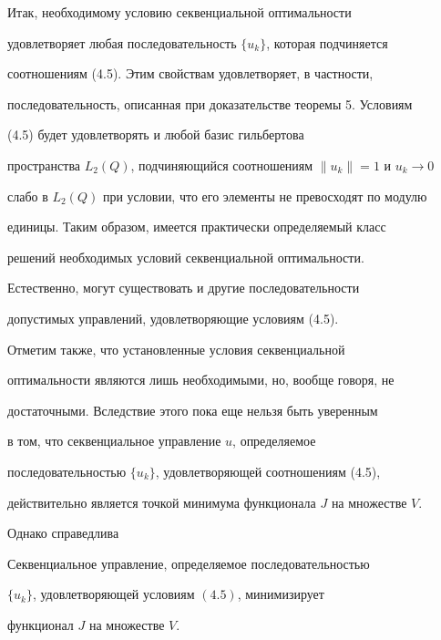  


Итак, необходимому условию секвенциальной оптимальности 


удовлетворяет любая последовательность $\{u_k\}$, которая подчиняется 


соотношениям (4.5). Этим свойствам удовлетворяет, в частности, 


последовательность, описанная при доказательстве теоремы 5. Условиям 


(4.5) будет удовлетворять и любой базис гильбертова 


пространства $L_2(Q)$, подчиняющийся соотношениям $\|u_k\|=1$ и $u_k\to0$ 


слабо в $L_2(Q)$ при условии, что его элементы не превосходят по модулю 


единицы. Таким образом, имеется практически определяемый класс 


решений необходимых условий секвенциальной оптимальности. 


Естественно, могут существовать и другие последовательности 


допустимых управлений, удовлетворяющие условиям (4.5). 


 


Отметим также, что установленные условия секвенциальной 


оптимальности являются лишь необходимыми, но, вообще говоря, не 


достаточными. Вследствие этого пока еще нельзя быть уверенным 


в том, что секвенциальное управление $u$, определяемое 


последовательностью $\{u_k\}$, удовлетворяющей соотношениям (4.5), 


действительно является точкой минимума функционала $J$ на множестве $V$. 


Однако справедлива 


 


\begin{thm} 


Секвенциальное управление, определяемое последовательностью 


$\{u_k\}$, удовлетворяющей условиям $(4.5)$, минимизирует 


функционал $J$ на множестве $V$. 


\end{thm} 


 


